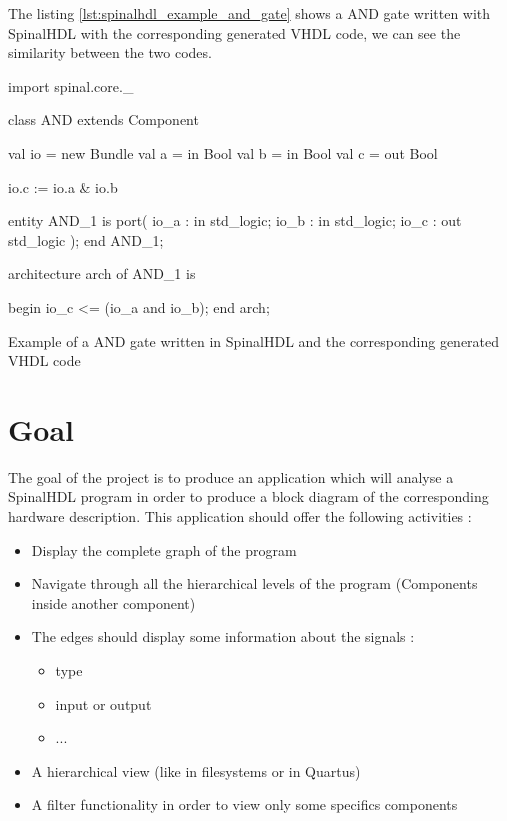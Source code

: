 The listing \ref{lst:spinalhdl_example_and_gate} shows a AND gate written with
SpinalHDL with the corresponding generated VHDL code, we can see the
similarity between the two codes.

\begin{listing}[H] %
    \centering

    \begin{minipage}[c]{0.45\textwidth}
    \begin{scalacode}
    import spinal.core._

    class AND extends Component
    {
        val io = new Bundle
        {
            val a = in Bool
            val b = in Bool
            val c = out Bool
        }

        io.c := io.a & io.b
    }
    \end{scalacode}
    \end{minipage}
    \hfill
    \begin{minipage}[c]{0.45\textwidth}
    \begin{vhdlcode}
    entity AND_1 is
        port(
            io_a : in std_logic;
            io_b : in std_logic;
            io_c : out std_logic
        );
    end AND_1;

    architecture arch of AND_1 is

    begin
      io_c <= (io_a and io_b);
    end arch;
    \end{vhdlcode}
    \end{minipage}
    \caption[SpinalHDL example and generated VHDL code]{Example of a AND gate written in SpinalHDL and the corresponding
             generated VHDL code}
    \label{lst:spinalhdl_example_and_gate}
\end{listing}

\section{Goal}
\label{sec:Goal}

The goal of the project is to produce an application which will analyse a
SpinalHDL program in order to produce a block diagram of the corresponding
hardware description. This application should offer the following activities :

\begin{itemize}
    \item Display the complete graph of the program
    \item Navigate through all the hierarchical levels of the program (Components
      inside another component)
    \item The edges should display some information about the signals :
    \begin{itemize}
        \item type
        \item input or output
        \item ...
    \end{itemize}
    \item A hierarchical view (like in filesystems or in Quartus)
    \item A filter functionality in order to view only some specifics components
\end{itemize}

